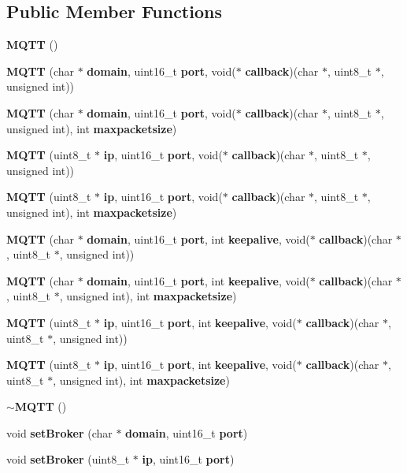 \subsection*{Public Member Functions}
\begin{DoxyCompactItemize}
\item 
\textbf{ M\+Q\+TT} ()
\item 
\textbf{ M\+Q\+TT} (char $\ast$\textbf{ domain}, uint16\+\_\+t \textbf{ port}, void($\ast$\textbf{ callback})(char $\ast$, uint8\+\_\+t $\ast$, unsigned int))
\item 
\textbf{ M\+Q\+TT} (char $\ast$\textbf{ domain}, uint16\+\_\+t \textbf{ port}, void($\ast$\textbf{ callback})(char $\ast$, uint8\+\_\+t $\ast$, unsigned int), int \textbf{ maxpacketsize})
\item 
\textbf{ M\+Q\+TT} (uint8\+\_\+t $\ast$\textbf{ ip}, uint16\+\_\+t \textbf{ port}, void($\ast$\textbf{ callback})(char $\ast$, uint8\+\_\+t $\ast$, unsigned int))
\item 
\textbf{ M\+Q\+TT} (uint8\+\_\+t $\ast$\textbf{ ip}, uint16\+\_\+t \textbf{ port}, void($\ast$\textbf{ callback})(char $\ast$, uint8\+\_\+t $\ast$, unsigned int), int \textbf{ maxpacketsize})
\item 
\textbf{ M\+Q\+TT} (char $\ast$\textbf{ domain}, uint16\+\_\+t \textbf{ port}, int \textbf{ keepalive}, void($\ast$\textbf{ callback})(char $\ast$, uint8\+\_\+t $\ast$, unsigned int))
\item 
\textbf{ M\+Q\+TT} (char $\ast$\textbf{ domain}, uint16\+\_\+t \textbf{ port}, int \textbf{ keepalive}, void($\ast$\textbf{ callback})(char $\ast$, uint8\+\_\+t $\ast$, unsigned int), int \textbf{ maxpacketsize})
\item 
\textbf{ M\+Q\+TT} (uint8\+\_\+t $\ast$\textbf{ ip}, uint16\+\_\+t \textbf{ port}, int \textbf{ keepalive}, void($\ast$\textbf{ callback})(char $\ast$, uint8\+\_\+t $\ast$, unsigned int))
\item 
\textbf{ M\+Q\+TT} (uint8\+\_\+t $\ast$\textbf{ ip}, uint16\+\_\+t \textbf{ port}, int \textbf{ keepalive}, void($\ast$\textbf{ callback})(char $\ast$, uint8\+\_\+t $\ast$, unsigned int), int \textbf{ maxpacketsize})
\item 
\textbf{ $\sim$\+M\+Q\+TT} ()
\item 
void \textbf{ set\+Broker} (char $\ast$\textbf{ domain}, uint16\+\_\+t \textbf{ port})
\item 
void \textbf{ set\+Broker} (uint8\+\_\+t $\ast$\textbf{ ip}, uint16\+\_\+t \textbf{ port})
\item 

\end{DoxyCompactItemize}
